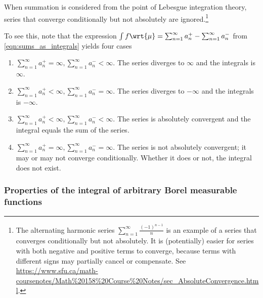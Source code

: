 \documentclass{article} %
\newcommand{\dmu}{\wrt{\mu}}
\begin{document}
\begin{remark}{}
When summation is considered from the point of Lebesgue integration theory, series that converge conditionally but not absolutely are ignored.\footnote{The alternating harmonic series $\sum_{n=1}^\infty \frac{(-1)^{n-1}}{n}$ is an example of a series that converges conditionally but not absolutely. It is (potentially) easier for series with both negative and positive terms to converge, because terms with different signs may partially cancel or compensate.  See \url{https://www.sfu.ca/math-coursenotes/Math\%20158\%20Course\%20Notes/sec\_AbsoluteConvergence.html}.} 

To see this, note that the expression $\int f \dmu = \sum_{n=1}^\infty a_n^+ - \sum_{n=1}^\infty a_n^-$ from \eqref{eqn:sums_as_integrals} yields four cases

\begin{enumerate}
\item 	$\sum_{n=1}^\infty a_n^+ = \infty,  \sum_{n=1}^\infty a_n^- < \infty$.  The series diverges to $\infty$ and the integrals is $\infty$.
\item  $\sum_{n=1}^\infty a_n^+ < \infty,  \sum_{n=1}^\infty a_n^- = \infty$. The series diverges to $-\infty$ and the integrals is $-\infty$.
\item $\sum_{n=1}^\infty a_n^+ < \infty,  \sum_{n=1}^\infty a_n^- < \infty$. The series is absolutely convergent and the integral equals the sum of the series.
\item  $\sum_{n=1}^\infty a_n^+ = \infty,  \sum_{n=1}^\infty a_n^- = \infty$. The series is not absolutely convergent; it may or may not converge conditionally.  Whether it does or not, the integral does not exist.
\end{enumerate}
\end{remark}


\subsubsection{Properties of the integral of arbitrary Borel measurable functions} \label{sec:properties_of_integral_of_arbitrary_Borel_measurable_functions}
\end{document}
